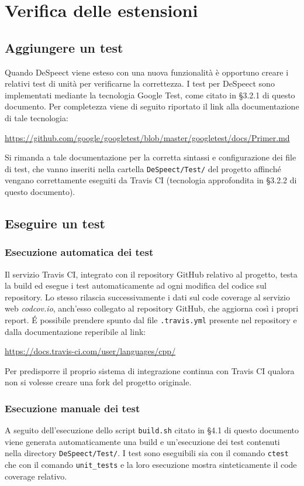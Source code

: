 \documentclass[openany,12pt,a4paper]{report}
\begin{document}
	\chapter{Verifica delle estensioni}
	
	\section{Aggiungere un test}
	
	Quando DeSpeect viene esteso con una nuova funzionalità è opportuno creare i relativi test di unità per verificarne la correttezza. I test per DeSpeect sono implementati mediante la tecnologia Google Test, come citato in §3.2.1 di questo documento. Per completezza viene di seguito riportato il link alla documentazione di tale tecnologia:
	\begin{center}
		\url{https://github.com/google/googletest/blob/master/googletest/docs/Primer.md}
	\end{center}
	Si rimanda a tale documentazione per la corretta sintassi e configurazione dei file di test, che vanno inseriti nella cartella \verb|DeSpeect/Test/| del progetto affinché vengano correttamente eseguiti da Travis CI (tecnologia approfondita in §3.2.2 di questo documento). 
	
	\section{Eseguire un test}
	
	\subsection{Esecuzione automatica dei test}
	Il servizio Travis CI, integrato con il repository GitHub relativo al progetto, testa la build ed esegue i test automaticamente ad ogni modifica del codice sul repository. Lo stesso rilascia successivamente i dati sul code coverage al servizio web \textit{codcov.io}, anch'esso collegato al repository GitHub, che aggiorna così i propri report. É possibile prendere spunto dal file \verb|.travis.yml| presente nel repository e dalla documentazione reperibile al link:
	\begin{center}
		\url{https://docs.travis-ci.com/user/languages/cpp/}
	\end{center}
	Per predisporre il proprio sistema di integrazione continua con Travis CI qualora non si volesse creare una fork del progetto originale. 
	
	\subsection{Esecuzione manuale dei test}
	A seguito dell'esecuzione dello script \verb|build.sh| citato in §4.1 di questo documento viene generata automaticamente una build e un'esecuzione dei test contenuti nella directory \verb|DeSpeect/Test/|. I test sono eseguibili sia con il comando \verb|ctest| che con il comando \verb|unit_tests| e la loro esecuzione mostra sinteticamente il code coverage relativo. 
	
\end{document}
